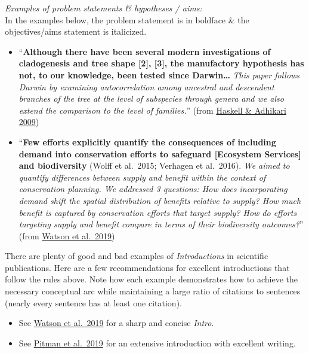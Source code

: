 \documentclass[
]{book}
\begin{document}
\emph{Examples of problem statements \& hypotheses / aims:}\\
In the examples below, the problem statement is in boldface \& the objectives/aims statement is italicized.

\begin{itemize}
\item
  ``\textbf{Although there have been several modern investigations of cladogenesis and tree shape {[}2{]}, {[}3{]}, the manufactory hypothesis has not, to our knowledge, been tested since Darwin\ldots{}} \emph{This paper follows Darwin by examining autocorrelation among ancestral and descendent branches of the tree at the level of subspecies through genera and we also extend the comparison to the level of families.}'' (from \href{https://journals.plos.org/plosone/article?id=10.1371/journal.pone.0005460}{Haskell \& Adhikari 2009})
\item
  ``\textbf{Few efforts explicitly quantify the consequences of including demand into conservation efforts to safeguard {[}Ecosystem Services{]} and biodiversity} (Wolff et al.~2015; Verhagen et al.~2016). \emph{We aimed to quantify differences between supply and benefit within the context of conservation planning. We addressed 3 questions: How does incorporating demand shift the spatial distribution of benefits relative to supply? How much benefit is captured by conservation efforts that target supply? How do efforts targeting supply and benefit compare in terms of their biodiversity outcomes?}'' (from \href{https://conbio.onlinelibrary.wiley.com/doi/full/10.1111/cobi.13276}{Watson et al.~2019})
\end{itemize}

There are plenty of good and bad examples of \emph{Introductions} in scientific publications. Here are a few recommendations for excellent introductions that follow the rules above. Note how each example demonstrates how to achieve the necessary conceptual arc while maintaining a large ratio of citations to sentences (nearly every sentence has at least one citation).

\begin{itemize}
\item
  See \href{https://conbio.onlinelibrary.wiley.com/doi/full/10.1111/cobi.13276}{Watson et al.~2019} for a sharp and concise \emph{Intro}.
\item
  See \href{https://onlinelibrary.wiley.com/doi/full/10.1111/mms.12661}{Pitman et al.~2019} for an extensive introduction with excellent writing.
\end{itemize}
\end{document}
